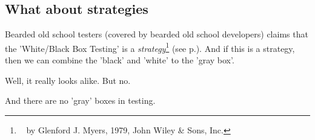 \subsection{What about strategies}

Bearded old school testers (covered by bearded old school developers) claims that the 'White/Black Box Testing' is a \emph{strategy}\footnote{~ by Glenford J. Myers, 1979, John Wiley \& Sons, Inc.} (see  p.\pageref{sec:Strategy}). And if this is a strategy, then we can combine the 'black' and 'white' to the 'gray box'.

Well, it really looks alike. But no.

And there are no 'gray' boxes in testing.
